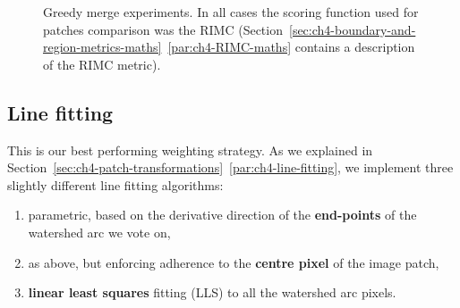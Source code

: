\begin{figure}[t]
\centering
\caption[Greedy merge experiments - plots]{Greedy merge experiments. In all cases the scoring function used for patches comparison was the RIMC (Section~\ref*{sec:ch4-boundary-and-region-metrics-maths}~\ref{par:ch4-RIMC-maths} contains a description of the RIMC metric).} %
\label{fig:segs-to-greedy-merge-RIMC}
\end{figure}

\subsection{Line fitting}
This is our best performing weighting strategy. As we explained in Section~\ref*{sec:ch4-patch-transformations}~\ref{par:ch4-line-fitting}, we implement three slightly different line fitting algorithms:
\begin{enumerate}
  \item parametric, based on the derivative direction of the {\bf end-points} of the watershed arc we vote on,
  \item as above, but enforcing adherence to the {\bf centre pixel} of the image patch,
  \item {\bf linear least squares} fitting (LLS) to all the watershed arc pixels.
\end{enumerate}

